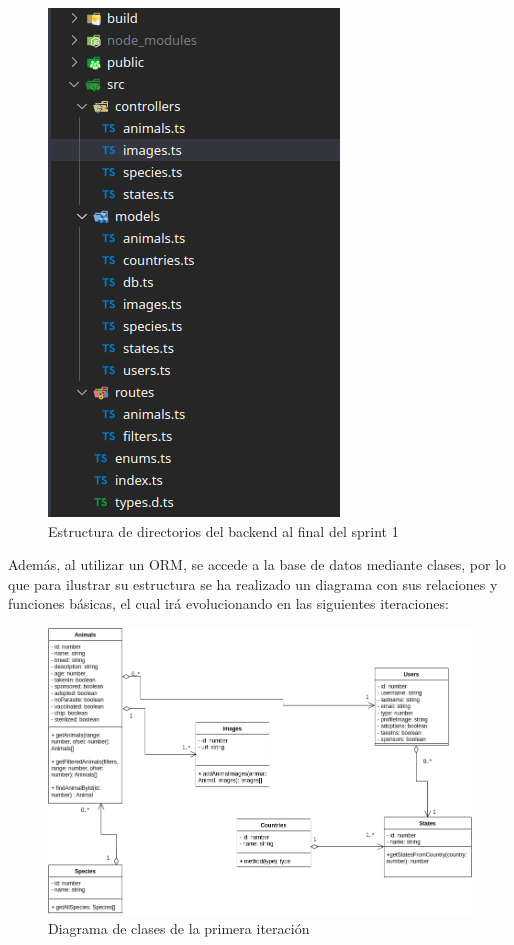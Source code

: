 \begin{figure}[H]
	\centering
	\includegraphics[width=0.6\linewidth]{"sprint 1/directoriosBack"}
	\caption{Estructura de directorios del backend al final del sprint 1}
	\label{fig:directoriosback1}
\end{figure}

Además, al utilizar un ORM, se accede a la base de datos mediante clases, por lo que para ilustrar su estructura se ha realizado un diagrama con sus relaciones y funciones básicas, el cual irá evolucionando en las siguientes iteraciones:

\begin{figure}[H]
	\centering
	\includegraphics[width=1\linewidth]{"sprint 1/clases"}
	\caption{Diagrama de clases de la primera iteración}
	\label{fig:clases}
\end{figure}


